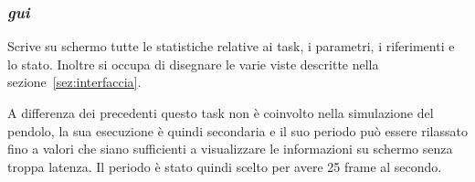 \subsubsection{\textit{gui}}
Scrive su schermo tutte le statistiche relative ai task, i parametri, i riferimenti e lo stato. Inoltre si occupa di disegnare le varie viste descritte nella sezione~\ref{sez:interfaccia}. 

A differenza dei precedenti questo task non \`e coinvolto nella simulazione del pendolo, la sua esecuzione \`e quindi secondaria e il suo periodo pu\`o essere rilassato fino a valori che siano sufficienti a visualizzare le informazioni su schermo senza troppa latenza. Il periodo \`e stato quindi scelto per avere 25 frame al secondo.
















